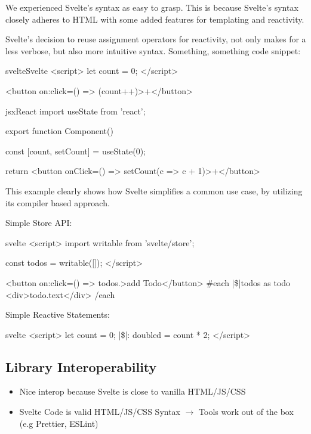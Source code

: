 We experienced Svelte's syntax as easy to grasp. This is because Svelte's syntax closely adheres to HTML with some added features for templating and reactivity.

Svelte's decision to reuse assignment operators for reactivity, not only makes for a less verbose, but also more intuitive syntax. Something, something code snippet:

\begin{myminted}{svelte}{Svelte}
<script>
    let count = 0;
</script>

<button on:click={() => (count++)}>+</button>
\end{myminted}

\begin{myminted}{jsx}{React}
import { useState } from 'react';

export function Component() {
    const [count, setCount] = useState(0);

    return <button onClick={() => setCount(c => c + 1)}>+</button>
}
\end{myminted}

This example clearly shows how Svelte simplifies a common use case, by utilizing its compiler based approach.

Simple Store API:
\begin{myminted}[escapeinside=||]{svelte}{}
<script>
    import { writable } from 'svelte/store';

    const todos = writable([]);
</script>

<button on:click={() => todos.}>add Todo</button>
{#each |\$|todos as todo}
    <div>{todo.text}</div>
{/each}
\end{myminted}

Simple Reactive Statements:
\begin{myminted}[escapeinside=||]{svelte}{}
<script>
    let count = 0;
    |\$|: doubled = count * 2;
</script>
\end{myminted}

\subsection{Library Interoperability}

\begin{itemize}
    \item Nice interop because Svelte is close to vanilla HTML/JS/CSS
    \item Svelte Code is valid HTML/JS/CSS Syntax $\rightarrow$ Tools work out of the box (e.g Prettier, ESLint)
\end{itemize}

